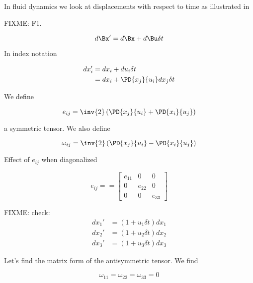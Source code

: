
In fluid dynamics we look at displacements with respect to time as illustrated in

FIXME: F1.

\begin{equation}\label{eqn:continuumL8:n}
d\Bx' = d\Bx + d\Bu \delta t
\end{equation}

In index notation

\begin{align*}
dx_i'
&= dx_i + du_i \delta t \\
&= dx_i + \PD{x_j}{u_i} dx_j \delta t
\end{align*}

We define

\begin{equation}\label{eqn:continuumL8:n}
e_{ij} = \inv{2} \left(
\PD{x_j}{u_i} +
\PD{x_i}{u_j} \right)
\end{equation}

a symmetric tensor.  We also define

\begin{equation}\label{eqn:continuumL8:n}
\omega_{ij} = \inv{2} \left(
\PD{x_j}{u_i}
-\PD{x_i}{u_j} \right)
\end{equation}

Effect of $e_{ij}$ when diagonalized

\begin{equation}\label{eqn:continuumL8:n}
e_{ij} =
=
\begin{bmatrix}
e_{11} & 0 & 0 \\
0 & e_{22} & 0 \\
0 & 0 & e_{33}
\end{bmatrix}
\end{equation}

FIXME: check:
\begin{align}\label{eqn:continuumL8:n}
dx_1' &= ( 1 + u_1 \delta t) dx_1 \\
dx_2' &= ( 1 + u_2 \delta t) dx_2 \\
dx_3' &= ( 1 + u_3 \delta t) dx_3
\end{align}

Let's find the matrix form of the antisymmetric tensor.  We find

\begin{equation}\label{eqn:continuumL8:n}
\omega_{11} = \omega_{22} = \omega_{33} = 0
\end{equation}

